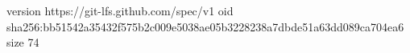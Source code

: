 version https://git-lfs.github.com/spec/v1
oid sha256:bb51542a35432f575b2c009e5038ae05b3228238a7dbde51a63dd089ca704ea6
size 74
